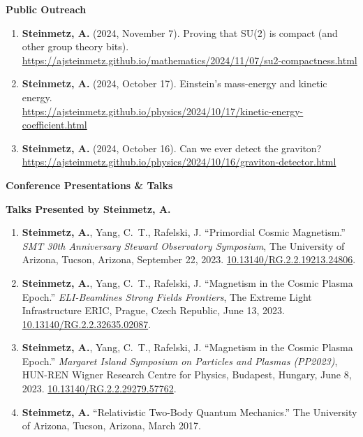 \documentclass[11pt]{article}
\begin{document}
\medskip

{\large\textbf{Public Outreach}}

\begin{enumerate}[leftmargin=*,nosep]
    \item \textbf{Steinmetz, A.} (2024, November 7). Proving that SU(2) is compact (and other group theory bits). \href{https://ajsteinmetz.github.io/mathematics/2024/11/07/su2-compactness.html}{https://ajsteinmetz.github.io/mathematics/2024/11/07/su2-compactness.html}
    \item \textbf{Steinmetz, A.} (2024, October 17). Einstein’s mass-energy and kinetic energy. \\ \href{https://ajsteinmetz.github.io/physics/2024/10/17/kinetic-energy-coefficient.html}{https://ajsteinmetz.github.io/physics/2024/10/17/kinetic-energy-coefficient.html}
    \item \textbf{Steinmetz, A.} (2024, October 16). Can we ever detect the graviton?\\ \href{https://ajsteinmetz.github.io/physics/2024/10/16/graviton-detector.html}{https://ajsteinmetz.github.io/physics/2024/10/16/graviton-detector.html}
\end{enumerate}

\medskip

{\Large\textbf{Conference Presentations \& Talks}}

{\large\textbf{Talks Presented by Steinmetz, A.}}

\begin{enumerate}[leftmargin=*,nosep]
    \item \textbf{Steinmetz, A.}, Yang, C.~T., Rafelski, J. ``Primordial Cosmic Magnetism.'' \textit{SMT 30th Anniversary Steward Observatory Symposium}, The University of Arizona, Tucson, Arizona, September 22, 2023. \href{http://dx.doi.org/10.13140/RG.2.2.19213.24806}{10.13140/RG.2.2.19213.24806}.
    \item \textbf{Steinmetz, A.}, Yang, C.~T., Rafelski, J. ``Magnetism in the Cosmic Plasma Epoch.'' \textit{ELI-Beamlines Strong Fields Frontiers}, The Extreme Light Infrastructure ERIC, Prague, Czech Republic, June 13, 2023. \href{http://dx.doi.org/10.13140/RG.2.2.32635.02087}{10.13140/RG.2.2.32635.02087}.
    \item \textbf{Steinmetz, A.}, Yang, C.~T., Rafelski, J. ``Magnetism in the Cosmic Plasma Epoch.'' \textit{Margaret Island Symposium on Particles and Plasmas (PP2023)}, HUN-REN Wigner Research Centre for Physics, Budapest, Hungary, June 8, 2023. \href{http://dx.doi.org/10.13140/RG.2.2.29279.57762}{10.13140/RG.2.2.29279.57762}.
    \item \textbf{Steinmetz, A.} ``Relativistic Two-Body Quantum Mechanics.'' The University of Arizona, Tucson, Arizona, March 2017.
\end{enumerate}
\end{document}
